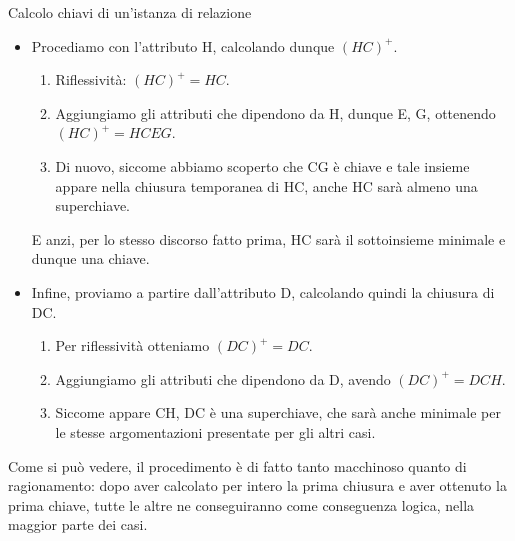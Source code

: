 \documentclass[12pt]{report}
\begin{document}
\begin{esercizio}{Calcolo chiavi di un'istanza di relazione}{}
\begin{itemize}
\begin{enumerate}
				\item In realtà qui il gioco è finito: siccome abbiamo già scoperto che ABC è una chiave, avendo trovato che $ABC \subseteq CGAB = (CG)^+$ siamo sicuri che il calcolo della chiusura d'ora in poi ci porterà ad ottenere l'intero schema di relazione. 
			\end{enumerate}
			Riguardo alla minimalità, siccome ogni chiave deve contenere C, abbiamo che questo è già il minimo sottoinsieme di CG che è al contempo chiave.
			
			\item Procediamo con l'attributo H, calcolando dunque $(HC)^+$.
			\begin{enumerate}
				\item Riflessività: $(HC)^+ = HC$.
				
				\item Aggiungiamo gli attributi che dipendono da H, dunque E, G, ottenendo $(HC)^+ = HCEG$.
				
				\item Di nuovo, siccome abbiamo scoperto che CG è chiave e tale insieme appare nella chiusura temporanea di HC, anche HC sarà almeno una superchiave.
			\end{enumerate}
			E anzi, per lo stesso discorso fatto prima, HC sarà il sottoinsieme minimale e dunque una chiave.
			
			\item Infine, proviamo a partire dall'attributo D, calcolando quindi la chiusura di DC.
			\begin{enumerate}
				\item Per riflessività otteniamo $(DC)^+ = DC$.
				
				\item Aggiungiamo gli attributi che dipendono da D, avendo $(DC)^+ = DCH$.
				
				\item Siccome appare CH, DC è una superchiave, che sarà anche minimale per le stesse argomentazioni presentate per gli altri casi.
			\end{enumerate}
		\end{itemize}
	\end{esercizio}
	Come si può vedere, il procedimento è di fatto tanto macchinoso quanto di ragionamento: dopo aver calcolato per intero la prima chiusura e aver ottenuto la prima chiave, tutte le altre ne conseguiranno come conseguenza logica, nella maggior parte dei casi.
	\smallbreak
	
\end{document}
